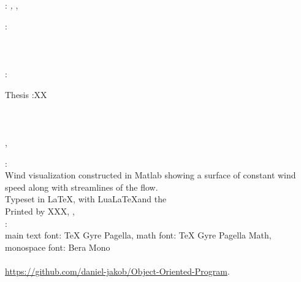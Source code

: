 \thispagestyle{empty}

\hfill

\vfill

\noindent\myName: \textit{\myTitle,} \mySubtitle, %
\textcopyright\ ~

\bigskip

\noindent{}: \\
\myProf \\
\myOtherProf \\
\mySupervisor \\
\noindent{}:\\
\myExaminer

\bigskip
\noindent\myDegree Thesis :XX\\
\noindent\myDepartment\\
\noindent\myFaculty\\
\noindent\myUni\\
\noindent\myLocation, \myCountry

\vfill


\noindent{}: \\
Wind visualization constructed in Matlab showing a surface of constant wind speed along with streamlines of the flow.\\
\medskip
\noindent Typeset in \LaTeX, with Lua\LaTeX{}and the \ctVersion\\
\noindent Printed by XXX, , \myPrintLocation\\
\noindent{}: \\
\noindent main text font: TeX Gyre Pagella, math font: TeX Gyre Pagella Math, monospace font: Bera Mono\\
\noindent{}\\
\url{https://github.com/daniel-jakob/Object-Oriented-Program}.